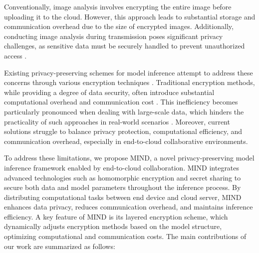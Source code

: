 \documentclass[conference]{IEEEtran}
\begin{document}
Conventionally, image analysis involves encrypting the entire image before uploading it to the cloud. However, this approach leads to substantial storage and communication overhead due to the size of encrypted images. Additionally, conducting image analysis during transmission poses significant privacy challenges, as sensitive data must be securely handled to prevent unauthorized access \cite{van2014datafication}.

Existing privacy-preserving schemes for model inference attempt to address these concerns through various encryption techniques \cite{fu2020vfl, yang2012efficient}. Traditional encryption methods, while providing a degree of data security, often introduce substantial computational overhead and communication cost \cite{kerschbaum2012outsourced}. This inefficiency becomes particularly pronounced when dealing with large-scale data, which hinders the practicality of such approaches in real-world scenarios \cite{li2015encdb}. Moreover, current solutions struggle to balance privacy protection, computational efficiency, and communication overhead, especially in end-to-cloud collaborative environments.

To address these limitations, we propose MIND, a novel privacy-preserving model inference framework enabled by end-to-cloud collaboration. MIND integrates advanced technologies such as homomorphic encryption and secret sharing to secure both data and model parameters throughout the inference process. By distributing computational tasks between end device and cloud server, MIND enhances data privacy, reduces communication overhead, and maintains inference efficiency. A key feature of MIND is its layered encryption scheme, which dynamically adjusts encryption methods based on the model structure, optimizing computational and communication costs. The main contributions of our work are summarized as follows:
\end{document}
